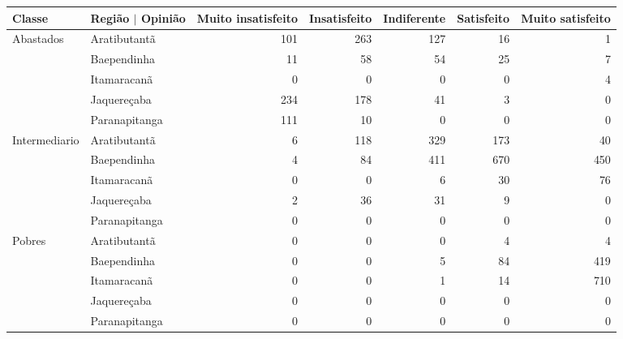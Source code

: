 \begin{table}[ht]
\centering
\begin{tabular}{ll rrrrr}
  \toprule
 Classe        & Região $\vert$ Opinião & \multicolumn{1}{l}{ Muito insatisfeito} & \multicolumn{1}{l}{ Insatisfeito} & \multicolumn{1}{l}{ Indiferente} & \multicolumn{1}{l}{ Satisfeito} & \multicolumn{1}{l}{ Muito satisfeito} \\ 
   \midrule
Abastados     & Aratibutantã            &                101 &          263 &         127 &         16 &                1 \\ 
                & Baependinha             &                 11 &           58 &          54 &         25 &                7 \\ 
                & Itamaracanã             &                  0 &            0 &           0 &          0 &                4 \\ 
                & Jaquereçaba             &                234 &          178 &          41 &          3 &                0 \\ 
                & Paranapitanga           &                111 &           10 &           0 &          0 &                0 \\ 
  Intermediario & Aratibutantã            &                  6 &          118 &         329 &        173 &               40 \\ 
                & Baependinha             &                  4 &           84 &         411 &        670 &              450 \\ 
                & Itamaracanã             &                  0 &            0 &           6 &         30 &               76 \\ 
                & Jaquereçaba             &                  2 &           36 &          31 &          9 &                0 \\ 
                & Paranapitanga           &                  0 &            0 &           0 &          0 &                0 \\ 
  Pobres        & Aratibutantã            &                  0 &            0 &           0 &          4 &                4 \\ 
                & Baependinha             &                  0 &            0 &           5 &         84 &              419 \\ 
                & Itamaracanã             &                  0 &            0 &           1 &         14 &              710 \\ 
                & Jaquereçaba             &                  0 &            0 &           0 &          0 &                0 \\ 
                & Paranapitanga           &                  0 &            0 &           0 &          0 &                0 \\ 
   \bottomrule
\end{tabular}
\end{table}

